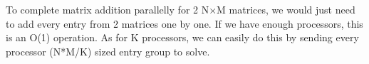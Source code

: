 To complete matrix addition parallelly for 2 N$\times$M matrices, we would just need to add every entry from 2 matrices one by one. If we have enough processors, this is an O(1) operation. As for K processors, we can easily do this by sending every processor (N*M/K) sized entry group to solve.